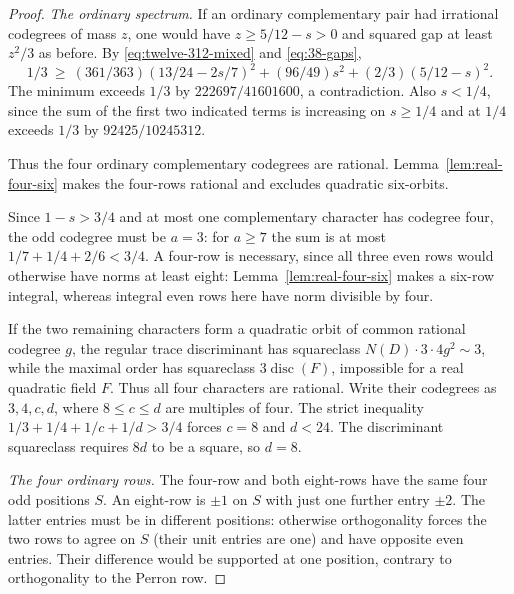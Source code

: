 \documentclass[11pt,reqno]{amsart}
\theoremstyle{remark}\newtheorem{remark}[theorem]{Remark}
\numberwithin{equation}{section}
\begin{document}
\begin{proof}
\emph{The ordinary spectrum.}
If an ordinary complementary pair had irrational codegrees of mass $z$, one would have $z\ge5/12-s>0$ and squared gap at least $z^2/3$ as before. By \eqref{eq:twelve-312-mixed} and \eqref{eq:38-gaps},
\[
 1/3\ \ge\ (361/363)(13/24-2s/7)^2
          +(96/49)s^2+(2/3)(5/12-s)^2 .
\]
The minimum exceeds $1/3$ by $222697/41601600$, a contradiction. Also $s<1/4$, since the sum of the first two indicated terms is increasing on $s\ge1/4$ and at $1/4$ exceeds $1/3$ by $92425/10245312$.

Thus the four ordinary complementary codegrees are rational.
Lemma~\ref{lem:real-four-six} makes the four-rows rational and
excludes quadratic six-orbits.

Since $1-s>3/4$ and at most one complementary character has codegree four, the odd codegree must be $a=3$: for $a\ge7$ the sum is at most $1/7+1/4+2/6<3/4$. A four-row is necessary, since all three even rows would otherwise
have norms at least eight: Lemma~\ref{lem:real-four-six} makes a
six-row integral, whereas integral even rows here have norm divisible
by four.

If the two remaining characters form a quadratic orbit of common rational codegree $g$, the regular trace discriminant has squareclass $N(D)\cdot3\cdot4g^2\sim3$, while the maximal order has squareclass $3\operatorname{disc}(F)$, impossible for a real quadratic field $F$. Thus all four characters are rational. Write their codegrees as $3,4,c,d$, where $8\le c\le d$ are multiples of four. The strict inequality $1/3+1/4+1/c+1/d>3/4$ forces $c=8$ and $d<24$. The discriminant squareclass requires $8d$ to be a square, so $d=8$.

\emph{The four ordinary rows.} The four-row and both eight-rows
have the same four odd positions $S$. An eight-row is $\pm1$ on $S$
with just one further entry $\pm2$. The latter entries must be in
different positions: otherwise orthogonality forces the two rows
to agree on $S$ (their unit entries are one) and have opposite even
entries. Their difference would be supported at one position, contrary
to orthogonality to the Perron row.


\end{proof}
\end{document}
